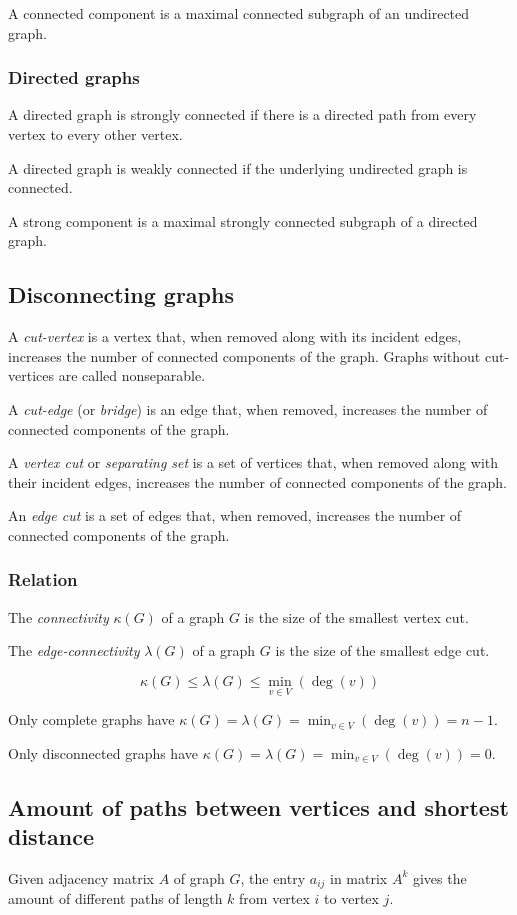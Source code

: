 A connected component is a maximal connected subgraph of an undirected graph.

\subsubsection{Directed graphs}
A directed graph is strongly connected if there is a directed path from every vertex to every other vertex.

A directed graph is weakly connected if the underlying undirected graph is connected.

A strong component is a maximal strongly connected subgraph of a directed graph.

\subsection{Disconnecting graphs}
A \emph{cut-vertex} is a vertex that, when removed along with its incident edges, increases the number of connected components of the graph. Graphs without cut-vertices are called nonseparable.

A \emph{cut-edge} (or \emph{bridge}) is an edge that, when removed, increases the number of connected components of the graph.

A \emph{vertex cut} or \emph{separating set} is a set of vertices that, when removed along with their incident edges, increases the number of connected components of the graph.

An \emph{edge cut} is a set of edges that, when removed, increases the number of connected components of the graph.

\subsubsection{Relation}
The \emph{connectivity} $\kappa(G)$ of a graph $G$ is the size of the smallest vertex cut.

The \emph{edge-connectivity} $\lambda(G)$ of a graph $G$ is the size of the smallest edge cut.

\[
    \kappa(G) \leq \lambda(G) \leq \min_{v \in V} (\deg(v))
\]

Only complete graphs have $\kappa(G) = \lambda(G) = \min_{v \in V} (\deg(v)) = n-1$.

Only disconnected graphs have $\kappa(G) = \lambda(G) = \min_{v \in V} (\deg(v)) = 0$.

\subsection{Amount of paths between vertices and shortest distance}
Given adjacency matrix $A$ of graph $G$, the entry $a_{ij}$ in matrix $A^k$ gives the amount of different paths of length $k$ from vertex $i$ to vertex $j$.

